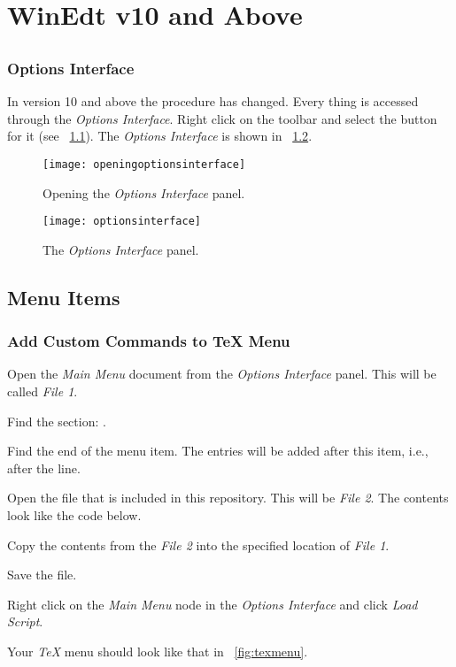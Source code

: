 \chapter{WinEdt v10 and Above}
\section{}
\subsection{Options Interface}
In version 10 and above the procedure has changed.  Every thing is accessed through the \textit{Options Interface}.  Right click on the toolbar and select the button for it (see \figurename~\ref{fig:openingoptionsinterface}).  The \textit{Options Interface} is shown in \figurename~\ref{fig:optionsinterface}.
\begin{figure}
	\centering
	\texttt{[image: openingoptionsinterface]}
	\caption[Opening the \textit{Options Interface} panel]{Opening the \textit{Options Interface} panel.}
	\label{fig:openingoptionsinterface}
\end{figure}

\begin{figure}
	\centering
	\texttt{[image: optionsinterface]}
	\caption[The \textit{Options Interface} panel]{The \textit{Options Interface} panel.}
	\label{fig:optionsinterface}
\end{figure}


\section{Menu Items}
\subsection{Add Custom Commands to TeX Menu}
\label{sec:addmenuitems}
\begin{numberedlist}
	\item Open the \textit{Main Menu} document from the \textit{Options Interface} panel.  This will be called \emph{File 1}.
	\item Find the section: .
	\item Find the end of the  menu item.  The entries will be added after this item, i.e., after the  line.
	\item Open the file  that is included in this repository.  This will be \emph{File 2}.  The contents look like the code below.
	\item Copy the contents from the \emph{File 2} into the specified location of \emph{File 1}.
	\item Save the file.
	\item Right click on the \emph{Main Menu} node in the \emph{Options Interface} and click \emph{Load Script}.
	\item Your \emph{TeX} menu should look like that in \figurename~\ref{fig:texmenu}.
\end{numberedlist}

